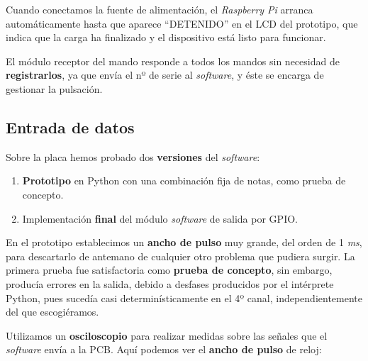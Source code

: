 \smallskip

Cuando conectamos la fuente de alimentación, el \textit{Raspberry Pi} arranca automáticamente hasta que aparece ``DETENIDO'' en el \acrshort{LCD} del prototipo, que indica que la carga ha finalizado y el dispositivo está listo para funcionar.

El módulo receptor del mando responde a todos los mandos sin necesidad de \textbf{registrarlos}, ya que envía el nº de serie al \textit{software}, y éste se encarga de gestionar la pulsación.

\subsection{Entrada de datos}

Sobre la placa hemos probado dos \textbf{versiones} del \textit{software}:

\begin{enumerate}
	\item \textbf{Prototipo} en Python con una combinación fija de notas, como prueba de concepto.
	\item Implementación \textbf{final} del módulo \textit{software} de salida por \acrshort{GPIO}.
\end{enumerate}

En el prototipo establecimos un \textbf{ancho de pulso} muy grande, del orden de 1 \textit{ms}, para descartarlo de antemano de cualquier otro problema que pudiera surgir. La primera prueba fue satisfactoria como \textbf{prueba de concepto}, sin embargo, producía errores en la salida, debido a desfases producidos por el intérprete Python, pues sucedía casi determinísticamente en el 4º canal, independientemente del que escogiéramos.

Utilizamos un \textbf{osciloscopio} para realizar medidas sobre las señales que el \textit{software} envía a la \acrshort{PCB}. Aquí podemos ver el \textbf{ancho de pulso} de reloj:

\smallskip

